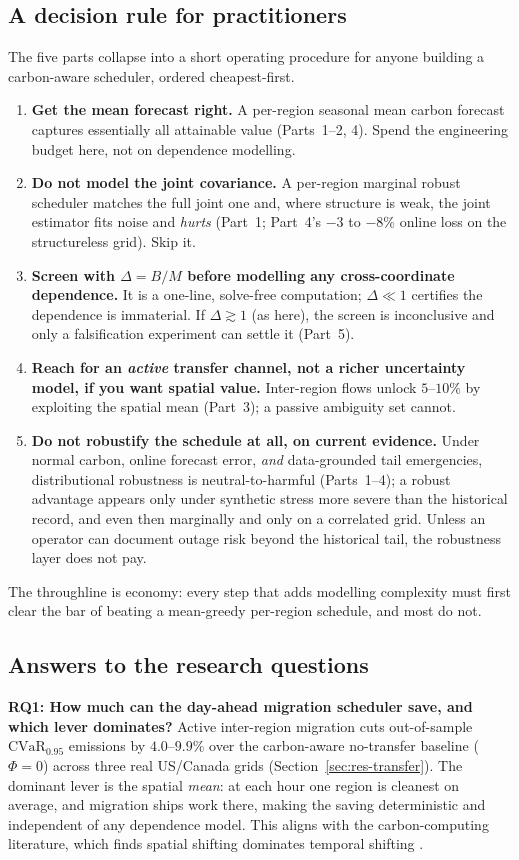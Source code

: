 \documentclass[12pt]{article}
\newcommand{\CVaR}{\mathrm{CVaR}}
\begin{document}
\subsection{A decision rule for practitioners}
The five parts collapse into a short operating procedure for anyone building a
carbon-aware scheduler, ordered cheapest-first.
\begin{enumerate}[leftmargin=1.6em,itemsep=2pt]
\item \textbf{Get the mean forecast right.} A per-region seasonal mean carbon forecast
captures essentially all attainable value (Parts~1--2, 4). Spend the engineering
budget here, not on dependence modelling.
\item \textbf{Do not model the joint covariance.} A per-region marginal robust
scheduler matches the full joint one and, where structure is weak, the joint estimator
fits noise and \emph{hurts} (Part~1; Part~4's $-3$ to $-8\%$ online loss on the
structureless grid). Skip it.
\item \textbf{Screen with $\Delta=B/M$ before modelling any cross-coordinate
dependence.} It is a one-line, solve-free computation; $\Delta\ll1$ certifies the
dependence is immaterial. If $\Delta\gtrsim1$ (as here), the screen is inconclusive and
only a falsification experiment can settle it (Part~5).
\item \textbf{Reach for an \emph{active} transfer channel, not a richer uncertainty
model, if you want spatial value.} Inter-region flows unlock $5$--$10\%$ by exploiting
the spatial mean (Part~3); a passive ambiguity set cannot.
\item \textbf{Do not robustify the schedule at all, on current evidence.} Under
normal carbon, online forecast error, \emph{and} data-grounded tail emergencies,
distributional robustness is neutral-to-harmful (Parts~1--4); a robust advantage
appears only under synthetic stress more severe than the historical record, and even
then marginally and only on a correlated grid. Unless an operator can document
outage risk beyond the historical tail, the robustness layer does not pay.
\end{enumerate}
The throughline is economy: every step that adds modelling complexity must first clear
the bar of beating a mean-greedy per-region schedule, and most do not.

\subsection{Answers to the research questions}
\textbf{RQ1: How much can the day-ahead migration scheduler save, and which lever
dominates?} Active inter-region migration cuts out-of-sample $\CVaR_{0.95}$ emissions
by $4.0$--$9.9\%$ over the
carbon-aware no-transfer baseline ($\Phi=0$) across three real US/Canada grids
(Section~\ref{sec:res-transfer}). The dominant lever is the spatial \emph{mean}: at
each hour one region is cleanest on average, and migration ships work there, making
the saving deterministic and independent of any dependence model. This aligns with
the carbon-computing literature, which finds spatial shifting dominates temporal
shifting \citep{wiesner2021,radovanovic2022}.
\end{document}
